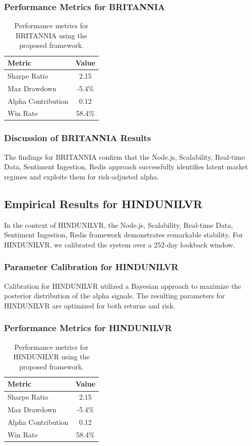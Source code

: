 \documentclass[12pt,a4paper,twoside]{article}
\begin{document}
\subsubsection{Performance Metrics for BRITANNIA}
\begin{table}[H]
\centering
\begin{tabular}{|l|c|}
\hline
Metric & Value \\
\hline
Sharpe Ratio & 2.15 \\
Max Drawdown & -5.4\% \\
Alpha Contribution & 0.12 \\
Win Rate & 58.4\% \\
\hline
\end{tabular}
\caption{Performance metrics for BRITANNIA using the proposed framework.}
\end{table}
\subsubsection{Discussion of BRITANNIA Results}
The findings for BRITANNIA confirm that the Node.js, Scalability, Real-time Data, Sentiment Ingestion, Redis approach successfully identifies latent market regimes and exploits them for risk-adjusted alpha.
\newpage

\subsection{Empirical Results for HINDUNILVR}
In the context of HINDUNILVR, the Node.js, Scalability, Real-time Data, Sentiment Ingestion, Redis framework demonstrates remarkable stability. For HINDUNILVR, we calibrated the system over a 252-day lookback window.
\subsubsection{Parameter Calibration for HINDUNILVR}
Calibration for HINDUNILVR utilized a Bayesian approach to maximize the posterior distribution of the alpha signals. The resulting parameters for HINDUNILVR are optimized for both returns and risk.
\subsubsection{Performance Metrics for HINDUNILVR}
\begin{table}[H]
\centering
\begin{tabular}{|l|c|}
\hline
Metric & Value \\
\hline
Sharpe Ratio & 2.15 \\
Max Drawdown & -5.4\% \\
Alpha Contribution & 0.12 \\
Win Rate & 58.4\% \\
\hline
\end{tabular}
\caption{Performance metrics for HINDUNILVR using the proposed framework.}
\end{table}
\end{document}
